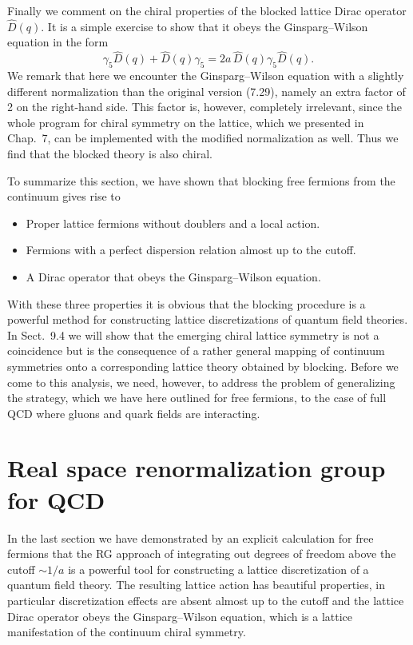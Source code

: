 Finally we comment on the chiral properties of the blocked lattice Dirac
operator $\hat D(q)$. It is a simple exercise to show that it obeys the
Ginsparg--Wilson equation in the form
\begin{equation}
  \gamma_5\hat D(q) + \hat D(q)\gamma_5 = 2a\,\hat D(q)\gamma_5\hat D(q) .
\end{equation}
We remark that here we encounter the Ginsparg--Wilson equation with a slightly
different normalization than the original version (7.29), namely an extra
factor of 2 on the right-hand side. This factor is, however, completely
irrelevant, since the whole program for chiral symmetry on the lattice, which
we presented in Chap.~7, can be implemented with the modified normalization as
well. Thus we find that the blocked theory is also chiral.

To summarize this section, we have shown that blocking free fermions from the
continuum gives rise to
\begin{itemize}
  \item Proper lattice fermions without doublers and a local action.
  \item Fermions with a perfect dispersion relation almost up to the cutoff.
  \item A Dirac operator that obeys the Ginsparg--Wilson equation.
\end{itemize}
With these three properties it is obvious that the blocking procedure is a
powerful method for constructing lattice discretizations of quantum field
theories. In Sect.~9.4 we will show that the emerging chiral lattice symmetry
is not a coincidence but is the consequence of a rather general mapping of
continuum symmetries onto a corresponding lattice theory obtained by blocking.
Before we come to this analysis, we need, however, to address the problem of
generalizing the strategy, which we have here outlined for free fermions, to
the case of full QCD where gluons and quark fields are interacting.

\section{Real space renormalization group for QCD}
\label{sec:9.3}

In the last section we have demonstrated by an explicit calculation for free
fermions that the RG approach of integrating out degrees of freedom above the
cutoff $\sim 1/a$ is a powerful tool for constructing a lattice discretization
of a quantum field theory. The resulting lattice action has beautiful
properties, in particular discretization effects are absent almost up to the
cutoff and the lattice Dirac operator obeys the Ginsparg--Wilson equation,
which is a lattice manifestation of the continuum chiral symmetry.

